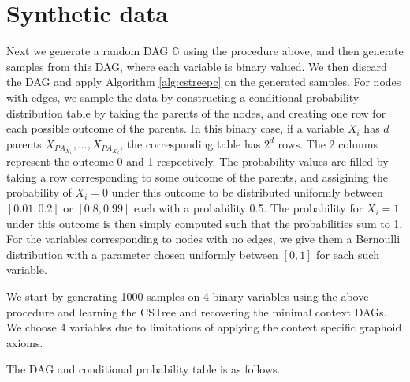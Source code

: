 \documentclass{tufte-book}
\begin{document}
\section{Synthetic data}
\label{sec:orgbec70b9}
Next we generate a random DAG \(\mathbb{G}\) using the procedure above, and then generate samples from this DAG, where each variable is binary valued. We then discard the DAG and apply Algorithm \ref{alg:cstreepc} on the generated samples. For nodes with edges, we sample the data by constructing a conditional probability distribution table by taking the parents of the nodes, and creating one row for each possible outcome of the parents. In this binary case, if a variable \(X_i\) has \(d\) parents \(X_{PA_{X_1}},...,X_{PA_{X_d}}\), the corresponding table has \(2^d\) rows. The 2 columns represent the outcome 0 and 1 respectively. The probability values are filled by taking a row corresponding to some outcome of the parents, and assigining the probability of \(X_i=0\) under this outcome to be distributed uniformly between \([0.01,0.2]\) or \([0.8,0.99]\) each with a probability 0.5. The probability for \(X_i=1\) under this outcome is then simply computed such that the probabilities sum to 1. For the variables corresponding to nodes with no edges, we give them a Bernoulli distribution with a parameter chosen uniformly between \([0,1]\) for each such variable.



We start by generating 1000 samples on 4 binary variables using the above procedure and learning the CSTree and recovering the minimal context DAGs. We choose 4 variables due to limitations of applying the context specific graphoid axioms.

The DAG and conditional probability table is as follows.
\end{document}
